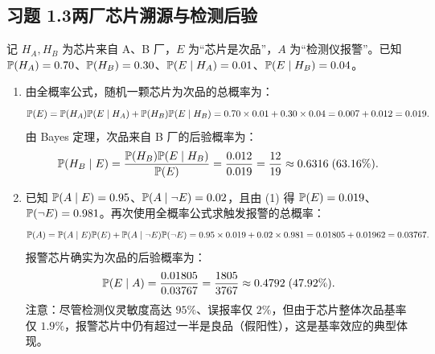 \subsection*{习题 1.3\quad 两厂芯片溯源与检测后验}
记 $H_A, H_B$ 为芯片来自 A、B 厂，$E$ 为“芯片是次品”，$A$ 为“检测仪报警”。已知 $\mathbb{P}(H_A)=0.70$、$\mathbb{P}(H_B)=0.30$、$\mathbb{P}(E\mid H_A)=0.01$、$\mathbb{P}(E\mid H_B)=0.04$。
\begin{enumerate}[label=(\arabic*), leftmargin=1.8em]
  \item 由全概率公式，随机一颗芯片为次品的总概率为：
  \[
    \mathbb{P}(E) = \mathbb{P}(H_A)\mathbb{P}(E\mid H_A) + \mathbb{P}(H_B)\mathbb{P}(E\mid H_B)
             = 0.70 \times 0.01 + 0.30 \times 0.04 = 0.007 + 0.012 = 0.019.
  \]
  由 Bayes 定理，次品来自 B 厂的后验概率为：
  \[
    \mathbb{P}(H_B \mid E) = \frac{\mathbb{P}(H_B)\mathbb{P}(E\mid H_B)}{\mathbb{P}(E)}
                      = \frac{0.012}{0.019} = \frac{12}{19} \approx 0.6316 \;(63.16\%).
  \]
  \item 已知 $\mathbb{P}(A\mid E)=0.95$、$\mathbb{P}(A\mid \neg E)=0.02$，且由 (1) 得 $\mathbb{P}(E)=0.019$、$\mathbb{P}(\neg E)=0.981$。再次使用全概率公式求触发报警的总概率：
  \[
    \mathbb{P}(A) = \mathbb{P}(A\mid E)\mathbb{P}(E) + \mathbb{P}(A\mid \neg E)\mathbb{P}(\neg E)
             = 0.95 \times 0.019 + 0.02 \times 0.981 = 0.01805 + 0.01962 = 0.03767.
  \]
  报警芯片确实为次品的后验概率为：
  \[
    \mathbb{P}(E \mid A) = \frac{0.01805}{0.03767} = \frac{1805}{3767} \approx 0.4792 \;(47.92\%).
  \]
  注意：尽管检测仪灵敏度高达 $95\%$、误报率仅 $2\%$，但由于芯片整体次品基率仅 $1.9\%$，报警芯片中仍有超过一半是良品（假阳性），这是基率效应的典型体现。
\end{enumerate}

